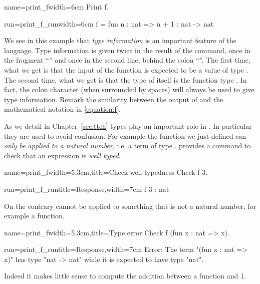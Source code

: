 \begin{coq}{name=print_f}{width=6cm}
Print f.
$~$
\end{coq}
\begin{coqout}{run=print_f_run}{width=6cm}
f = fun n : nat => n + 1
  : nat -> nat
\end{coqout}

We see in this example that {\em type information} is an important
feature of the language.  Type information is given twice in the
result of the  command, once in the fragment ``'' and once in the second line, behind the colon ``\C{:}''.  The first
time, what we get is that the input of the function is expected to be
a value of type .  The second time, what we get is that the
type of  itself is the function type .  In fact,
the colon character (when surrounded by spaces) will always be used to
give type information.  Remark the similarity between the output of 
and the mathematical notation in \eqref{equation:f}.

As we detail in Chapter~\ref{sec:ttch} types play an important role in \Coq{}.
In particular they are used to avoid confusion.  For example
the function  we just defined can \emph{only
be applied to a natural number}, i.e. a term of type .
\Coq{} provides a command to check that an expression is \emph{well typed}.

\begin{coq}{name=print_f}{width=5.3cm,title=Check well-typedness}
Check f 3.
\end{coq}
\begin{coqout}{run=print_f_run}{title=Response,width=7cm}
 f 3 : nat
\end{coqout}
On the contrary  cannot be applied to something that 
is not a natural number, for example a function.

\begin{coq}{name=print_f}{width=5.3cm,title=Type error}
Check f (fun x : nat => x).
$~$
$~$
\end{coq}
\begin{coqout}{run=print_f_run}{title=Response,width=7cm}
Error: The term "(fun x : nat => x)"
has type "nat -> nat" while it is
expected to have type "nat".
\end{coqout}
Indeed it makes little sense to compute the addition between
a function and 1.

